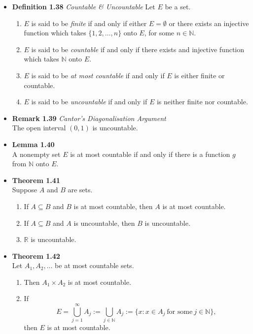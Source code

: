 \documentclass[11pt,a4paper]{article}
\begin{document}
\begin{itemize}
    \item \textbf{Definition 1.38} \emph{Countable & Uncountable}
        Let $E$ be a set.
        \begin{enumerate}
            \item $E$ is said to be \emph{finite} if and only if either $E = \emptyset$
                or there exists an injective function which takes
                $\{ 1, 2, \ldots, n \}$ onto $E$, for some $n \in \mathbb{N}$.
            \item $E$ is said to be \emph{countable} if and only if there exists and injective
                function which takes $\mathbb{N}$ onto $E$.
            \item $E$ is said to be \emph{at most countable} if and only if $E$ is either
                finite or countable.
            \item $E$ is said to be \emph{uncountable} if and only if $E$ is neither finite nor
                countable.
        \end{enumerate}

    \item \textbf{Remark 1.39} \emph{Cantor's Diagonalisation Argument} \\
        The open interval $(0, 1)$ is uncountable.

    \item \textbf{Lemma 1.40} \\
        A nonempty set $E$ is at most countable if and only if there is a function $g$ from
        $\mathbb{N}$ onto $E$.

    \item \textbf{Theorem 1.41} \\
        Suppose $A$ and $B$ are sets.
        \begin{enumerate}
            \item If $A \subseteq B$ and $B$ is at most countable, then $A$ is at most
                countable.
            \item If $A \subseteq B$ and $A$ is uncountable, then $B$ is uncountable.
            \item $\mathbb{R}$ is uncountable.
        \end{enumerate}

    \item \textbf{Theorem 1.42} \\
        Let $A_1, A_2, \ldots$ be at most countable sets.
        \begin{enumerate}
            \item Then $A_1 \times A_2$ is at most countable.
            \item If
                \[
                    E = \bigcup_{j=1}^\infty A_j :=
                    \bigcup_{j \in \mathbb{N}} A_j :=
                    \{ x : x \in A_j \ \text{for some} \ j \in \mathbb{N} \},
                \]
                then $E$ is at most countable.
        \end{enumerate}


\end{itemize}
\end{document}
